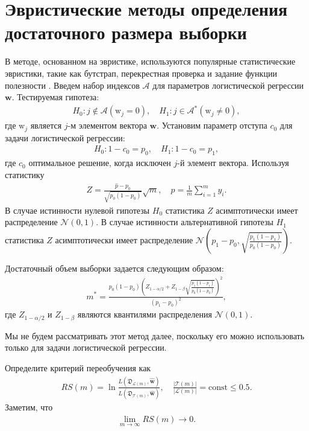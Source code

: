 \section{Эвристические методы определения достаточного размера выборки}
В методе, основанном на эвристике, используются популярные статистические эвристики, такие как бутстрап, перекрестная проверка и задание функции полезности .
Введем набор индексов $\mathcal {A} $ для параметров логистической регрессии $\textbf {w} $. Тестируемая гипотеза:
\[
\label{eq:hb:1}
\begin{aligned}
	H_0: j \not\in\mathcal{A} \left(\text{w}_{j} = 0\right), \quad H_1: j \in \mathcal{A}^* \left(\text{w}_{j} \not= 0\right),
\end{aligned}
\]
где $\text{w}_{j}$ является $j$-м элементом вектора $\textbf{w}$.
Установим параметр отступа $ c_0 $ для задачи логистической регрессии:
\[
\label{eq:hb:2}
\begin{aligned}
	H_0: 1-c_0 = p_0, \quad H_1: 1-c_0 = p_1,
\end{aligned}
\]
где $c_0$ оптимальное решение, когда исключен $j$-й элемент вектора.
Используя статистику
\[
\label{eq:hb:3}
\begin{aligned}
	Z = \frac{\hat{p}-p_0}{\sqrt{p_0(1-p_0)}}\sqrt{m}, \quad \hat{p} = \frac{1}{m}\sum_{i=1}^{m}y_i.
\end{aligned}
\]
В случае истинности нулевой гипотезы $H_0$ статистика $Z$ асимптотически имеет распределение $\mathcal{N}\left(0, 1\right)$. В случае истинности альтернативной гипотезы $H_1$ статистика $Z$  асимптотически имеет распределение $ \mathcal{N}\left(p_1-p_0, \sqrt{\frac{p_1(1-p_1)}{p_0(1-p_0)}}\right)$.
      
Достаточный объем выборки задается следующим образом:
\[
\label{eq:hb:4}
\begin{aligned}
	m^* = \frac{p_0(1-p_0)\left(Z_{1-\alpha/2} + Z_{1-\beta}\sqrt{\frac{p_1(1-p_1)}{p_0(1-p_0)}}\right)^2}{(p_1-p_0)^2},
\end{aligned}
\]
где $Z_{1-\alpha/2}$ и $Z_{1-\beta}$ являются квантилями распределения $\mathcal{N}\left(0, 1\right)$.
    
Мы не будем рассматривать этот метод далее, поскольку его можно использовать только для задачи логистической регрессии.
    
Определите критерий переобучения как
\[
\label{eq:hb:5}
\begin{aligned}
	RS(m) = \ln\frac{L(\mathfrak{D}_{\mathcal{L}(m)}, \hat{\textbf{w}})}{L(\mathfrak{D}_{\mathcal{T}(m)}, \hat{\textbf{w}})}, \quad \frac{|\mathcal{T}(m)|}{|\mathcal{L}(m)|} = \text{const} \leq 0.5.
\end{aligned}
\]
Заметим, что
\[
\label{eq:hb:6}
\begin{aligned}
	\lim_{m\to \infty}RS(m) \to 0.
\end{aligned}
\]

